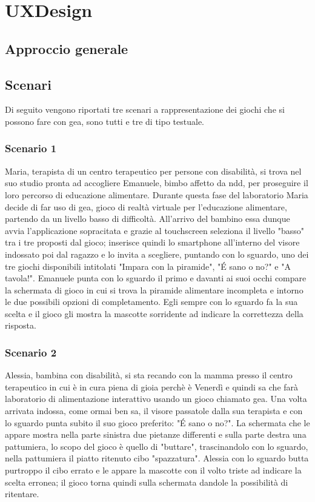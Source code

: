 \section{UXDesign} \label{sec:design}

\subsection{Approccio generale} \label{subsec:app}

\subsection{Scenari} \label{scenari}
Di seguito vengono riportati tre scenari a rappresentazione dei giochi che si possono fare con \acs{gea}, sono tutti e tre di tipo testuale.
\subsubsection{Scenario 1}
Maria, terapista di un centro terapeutico per persone con disabilità, si trova nel suo studio pronta ad accogliere Emanuele, bimbo affetto da \acs{ndd}, per proseguire il loro percorso di educazione alimentare. Durante questa fase del laboratorio Maria decide di far uso di \acs{gea}, gioco di realtà virtuale per l'educazione alimentare, partendo da un livello basso di difficoltà. All'arrivo del bambino essa dunque avvia l'applicazione sopracitata e grazie al touchscreen seleziona il livello "basso" tra i tre proposti dal gioco; inserisce quindi lo smartphone all'interno del visore indossato poi dal ragazzo e lo invita a scegliere, puntando con lo sguardo, uno dei tre giochi disponibili  intitolati "Impara con la piramide", "É sano o no?" e "A tavola!". Emanuele punta con lo sguardo il primo e davanti ai suoi occhi compare la schermata di gioco in cui si trova la piramide alimentare incompleta e intorno le due possibili opzioni di completamento. Egli sempre con lo sguardo fa la sua scelta e il gioco gli mostra la mascotte sorridente ad indicare la correttezza della risposta.
\subsubsection{Scenario 2}
Alessia, bambina con disabilità, si sta recando con la mamma presso il centro terapeutico in cui è in cura piena di gioia perchè è Venerdì e quindi sa che farà laboratorio di alimentazione interattivo usando un gioco chiamato \acs{gea}. Una volta arrivata indossa, come ormai ben sa, il visore passatole dalla sua terapista e con lo sguardo punta subito il suo gioco preferito: "É sano o no?". La schermata che le appare mostra nella parte sinistra due pietanze differenti e sulla parte destra una pattumiera, lo scopo del gioco è quello di "buttare", trascinandolo con lo sguardo, nella pattumiera il piatto ritenuto cibo "spazzatura". Alessia con lo sguardo butta purtroppo il cibo errato e le appare la mascotte con il volto triste ad indicare la scelta erronea; il gioco torna quindi sulla schermata dandole la possibilità di ritentare.
